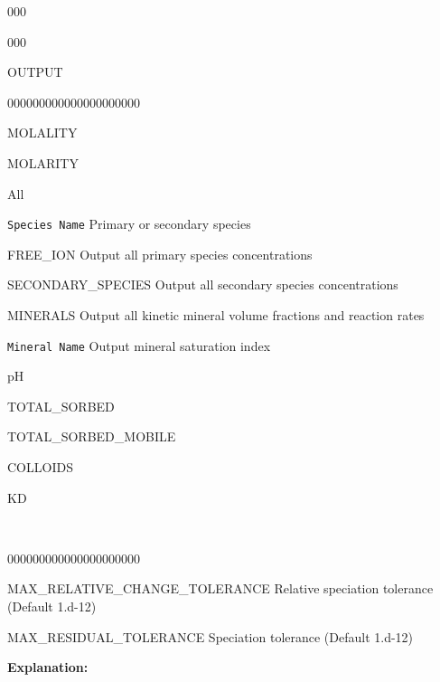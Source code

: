\documentclass[12pt]{article}
\begin{document}
\begin{deflist}{000}
\begin{deflist}{000}
\item[OUTPUT] ~
\begin{deflist}{000000000000000000000}
\item[MOLALITY]
\item[MOLARITY]
\item[All]
\item[\tt Species Name] Primary or secondary species
\item[FREE\_ION] Output all primary species concentrations
\item[SECONDARY\_SPECIES] Output all secondary species concentrations
\item[MINERALS] Output all kinetic mineral volume fractions and reaction rates
\item[\tt Mineral Name] Output mineral saturation index
\item[pH]
\item[TOTAL\_SORBED]
\item[TOTAL\_SORBED\_MOBILE]
\item[COLLOIDS]
\item[KD]
\end{deflist}

\item [\keyend]

~ 

\end{deflist}
\begin{deflist}{000000000000000000000}
\item[MAX\_RELATIVE\_CHANGE\_TOLERANCE] Relative speciation tolerance (Default 1.d-12)
\item[MAX\_RESIDUAL\_TOLERANCE] Speciation tolerance (Default 1.d-12)
\end{deflist}

\item [\keyend]
\end{deflist}

\noindent
{\bf Explanation:}
\end{document}
